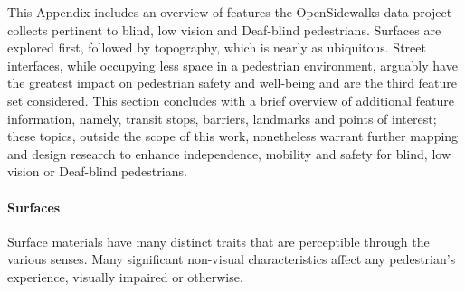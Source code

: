 
This Appendix includes an overview of features the OpenSidewalks data project collects pertinent to blind, low vision and Deaf-blind pedestrians. Surfaces are explored first, followed by topography, which is nearly as ubiquitous.  Street interfaces, while occupying less space in a pedestrian environment, arguably have the greatest impact on pedestrian safety and well-being and are the third feature set considered.
This section concludes with a brief overview of additional feature information, namely, transit stops, barriers, landmarks and points of interest; these topics, outside the scope of this work, nonetheless warrant further mapping and design research to enhance independence, mobility and safety for blind, low vision or Deaf-blind pedestrians.

\paragraph{Surfaces}
Surface materials have many distinct traits that are perceptible through the various senses.  Many significant non-visual characteristics affect any pedestrian’s experience, visually impaired or otherwise.
